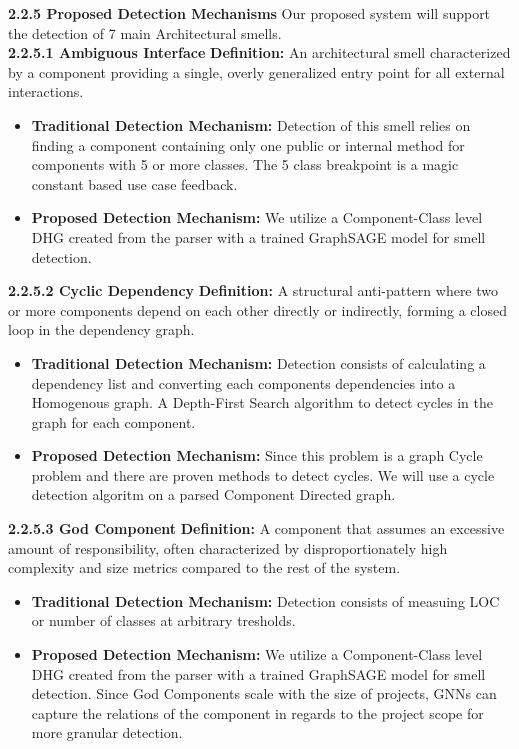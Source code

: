 \textbf{2.2.5 Proposed Detection Mechanisms}
Our proposed system will support the detection of 7 main Architectural smells.
\\

\textbf{2.2.5.1 Ambiguous Interface}
\textbf{Definition:} An architectural smell characterized by a component providing a single, overly generalized entry point for all external interactions.
\begin{itemize}
    \item \textbf{Traditional Detection Mechanism:} Detection of this smell relies on finding a component containing only one public
    or internal method for components with 5 or more classes. The 5 class breakpoint is a magic constant based use case feedback.
    \item \textbf{Proposed Detection Mechanism:} We utilize a Component-Class level DHG created from the parser with a trained GraphSAGE model for smell detection.
\end{itemize}

\vspace{1em}
\textbf{2.2.5.2 Cyclic Dependency}
\textbf{Definition:} A structural anti-pattern where two or more components depend on each other directly or indirectly, forming a closed loop in the dependency graph.
\begin{itemize}
    \item \textbf{Traditional Detection Mechanism:} Detection consists of calculating a dependency list and converting each components dependencies into a Homogenous graph.
    A Depth-First Search algorithm to detect cycles in the graph for each component.
    \item \textbf{Proposed Detection Mechanism:} Since this problem is a graph Cycle problem and there are proven methods to detect cycles. We will use a cycle detection algoritm on a parsed Component Directed graph.
\end{itemize}

\vspace{1em}
\textbf{2.2.5.3 God Component}
\textbf{Definition:} A component that assumes an excessive amount of responsibility, often characterized by disproportionately high complexity and size metrics compared to the rest of the system.
\begin{itemize}
    \item \textbf{Traditional Detection Mechanism:} Detection consists of measuing LOC or number of classes at arbitrary tresholds.
    \item \textbf{Proposed Detection Mechanism:} We utilize a Component-Class level DHG created from the parser with a trained GraphSAGE model for smell detection.
     Since God Components scale with the size of projects, GNNs can capture the relations of the component in regards to the project scope for more granular detection.
\end{itemize}

